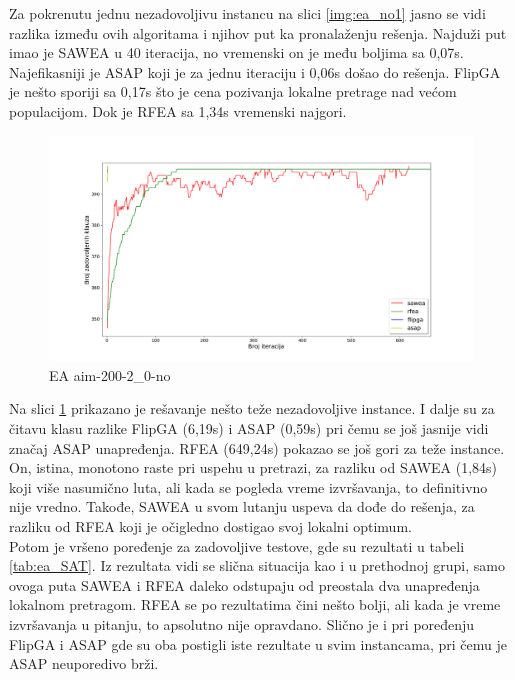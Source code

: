 \documentclass[a4paper]{article}
\begin{document}
Za pokrenutu jednu nezadovoljivu instancu na slici \ref{img:ea_no1} 
jasno se vidi razlika između ovih algoritama i njihov put ka pronalaženju rešenja.
Najduži put imao je SAWEA u 40 iteracija, no vremenski on je među boljima sa 0,07s.
Najefikasniji je ASAP koji je za jednu iteraciju i 0,06s došao do rešenja.
FlipGA je nešto sporiji sa 0,17s što je cena pozivanja lokalne pretrage nad većom
populacijom. Dok je RFEA sa 1,34s vremenski najgori.\\

\begin{figure}[h!]
\centering
\includegraphics[width=\textwidth]{ea-aim-200-2_0-no}
\caption{EA aim-200-2\_0-no}\label{img:ea_no2}
\end{figure}

Na slici \ref{img:ea_no2} prikazano je rešavanje nešto teže nezadovoljive instance.
I dalje su za čitavu klasu razlike FlipGA (6,19s) i ASAP (0,59s) pri čemu se još jasnije 
vidi značaj ASAP unapređenja. RFEA (649,24s) pokazao se još gori za teže instance. 
On, istina, monotono raste pri uspehu u pretrazi, za razliku od SAWEA (1,84s) koji više 
nasumično luta, ali kada se pogleda vreme izvršavanja, to definitivno nije vredno.
Takođe, SAWEA u svom lutanju uspeva da dođe do rešenja, za razliku od RFEA
koji je očigledno dostigao svoj lokalni optimum.\\

Potom je vršeno poređenje za zadovoljive testove, gde su rezultati u tabeli \ref{tab:ea_SAT}.
Iz rezultata vidi se slična situacija kao i u prethodnoj grupi, samo ovoga puta 
SAWEA i RFEA daleko odstupaju od preostala dva unapređenja lokalnom pretragom.
RFEA se po rezultatima čini nešto bolji, ali kada je vreme izvršavanja u pitanju, to
apsolutno nije opravdano. Slično je i pri poređenju FlipGA i ASAP gde su oba postigli
iste rezultate u svim instancama, pri čemu je ASAP neuporedivo brži.\\
\end{document}
